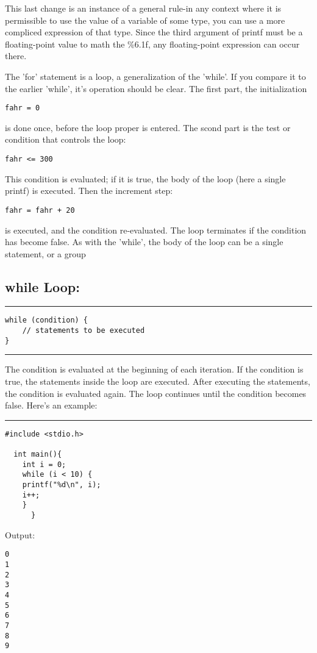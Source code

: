 \documentclass[a4paper]{article}
\begin{document}
This last change is an instance of a general rule-in any context where it is
permissible to use the value of a variable of some type, you can use a more
compliced expression of that type. Since the third argument of printf must be a
floating-point value to math the \%6.1f, any floating-point expression can occur
there.

The 'for' statement is a loop, a generalization of the 'while'. If you compare
it to the earlier 'while', it's operation should be clear. The first part, the
initialization
\begin{verbatim}
fahr = 0
\end{verbatim}
is done once, before the loop proper is entered. The scond part is the test or
condition that controls the loop:
\begin{verbatim}
fahr <= 300
\end{verbatim}
This condition is evaluated; if it is true, the body of the loop (here a single
printf) is executed. Then the increment step:

\begin{verbatim}
fahr = fahr + 20
\end{verbatim}
is executed, and the condition re-evaluated. The loop terminates if the
condition has become false. As with the 'while', the body of the loop can be a
single statement, or a group


\subsection{while Loop:}
\label{sec:org0a59d8c}
\noindent\rule{\textwidth}{0.5pt}
\begin{verbatim}
while (condition) {
    // statements to be executed
}
\end{verbatim}

\noindent\rule{\textwidth}{0.5pt}
The condition is evaluated at the beginning of each iteration. If the condition
is true, the statements inside the loop are executed. After executing the
statements, the condition is evaluated again. The loop continues until the
condition becomes false.
Here's an example:

\noindent\rule{\textwidth}{0.5pt}
\begin{verbatim}
#include <stdio.h>

  int main(){
	int i = 0;
	while (i < 10) {
	printf("%d\n", i);
	i++;
    }
      }
\end{verbatim}
Output:
\begin{verbatim}
0
1
2
3
4
5
6
7
8
9
\end{verbatim}
\end{document}
